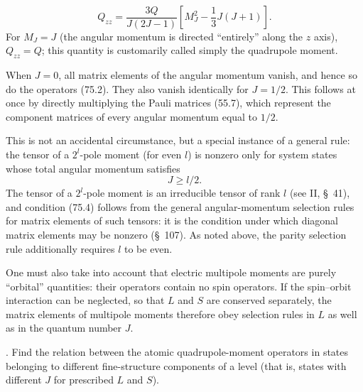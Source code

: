 
\begin{equation}
 Q_{zz}=\frac{3Q}{J(2J-1)}\left[M_J^2-\frac13J(J+1)\right].
 \tag{75.3}
\end{equation}
For $M_J=J$ (the angular momentum is directed ``entirely'' along the $z$ axis), $Q_{zz}=Q$; this quantity is customarily called simply the quadrupole moment.

When $J=0$, all matrix elements of the angular momentum vanish, and hence so do the operators (75.2). They also vanish identically for $J=1/2$. This follows at once by directly multiplying the Pauli matrices (55.7), which represent the component matrices of every angular momentum equal to $1/2$.

This is not an accidental circumstance, but a special instance of a general rule: the tensor of a $2^l$-pole moment (for even $l$) is nonzero only for system states whose total angular momentum satisfies
\begin{equation}
 J\geqslant l/2.
 \tag{75.4}
\end{equation}
The tensor of a $2^l$-pole moment is an irreducible tensor of rank $l$ (see II, \S~41), and condition (75.4) follows from the general angular-momentum selection rules for matrix elements of such tensors: it is the condition under which diagonal matrix elements may be nonzero (\S~107). As noted above, the parity selection rule additionally requires $l$ to be even.

One must also take into account that electric multipole moments are purely ``orbital'' quantities: their operators contain no spin operators. If the spin--orbit interaction can be neglected, so that $L$ and $S$ are conserved separately, the matrix elements of multipole moments therefore obey selection rules in $L$ as well as in the quantum number $J$.

. Find the relation between the atomic quadrupole-moment operators in states belonging to different fine-structure components of a level (that is, states with different $J$ for prescribed $L$ and $S$).

